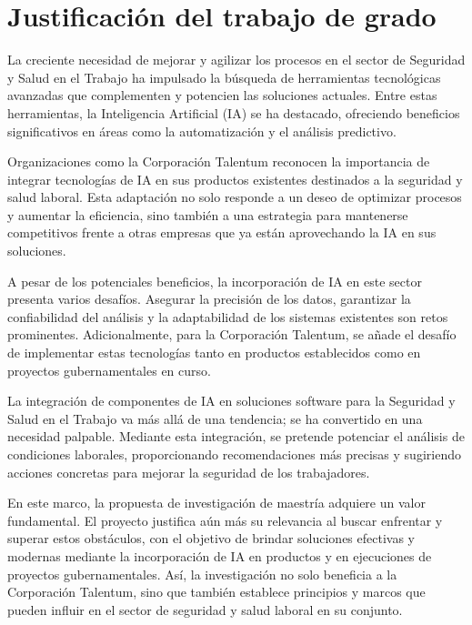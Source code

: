 \section{Justificación del trabajo de grado}
La creciente necesidad de mejorar y agilizar los procesos en el sector de Seguridad y Salud en el Trabajo ha impulsado la búsqueda de herramientas tecnológicas avanzadas que complementen y potencien las soluciones actuales. Entre estas herramientas, la Inteligencia Artificial (IA) se ha destacado, ofreciendo beneficios significativos en áreas como la automatización y el análisis predictivo.

Organizaciones como la Corporación Talentum reconocen la importancia de integrar tecnologías de IA en sus productos existentes destinados a la seguridad y salud laboral. Esta adaptación no solo responde a un deseo de optimizar procesos y aumentar la eficiencia, sino también a una estrategia para mantenerse competitivos frente a otras empresas que ya están aprovechando la IA en sus soluciones.

A pesar de los potenciales beneficios, la incorporación de IA en este sector presenta varios desafíos. Asegurar la precisión de los datos, garantizar la confiabilidad del análisis y la adaptabilidad de los sistemas existentes son retos prominentes. Adicionalmente, para la Corporación Talentum, se añade el desafío de implementar estas tecnologías tanto en productos establecidos como en proyectos gubernamentales en curso.

La integración de componentes de IA en soluciones software para la Seguridad y Salud en el Trabajo va más allá de una tendencia; se ha convertido en una necesidad palpable. Mediante esta integración, se pretende potenciar el análisis de condiciones laborales, proporcionando recomendaciones más precisas y sugiriendo acciones concretas para mejorar la seguridad de los trabajadores.

En este marco, la propuesta de investigación de maestría adquiere un valor fundamental. El proyecto justifica aún más su relevancia al buscar enfrentar y superar estos obstáculos, con el objetivo de brindar soluciones efectivas y modernas mediante la incorporación de IA en productos y en ejecuciones de proyectos gubernamentales. Así, la investigación no solo beneficia a la Corporación Talentum, sino que también establece principios y marcos que pueden influir en el sector de seguridad y salud laboral en su conjunto.
